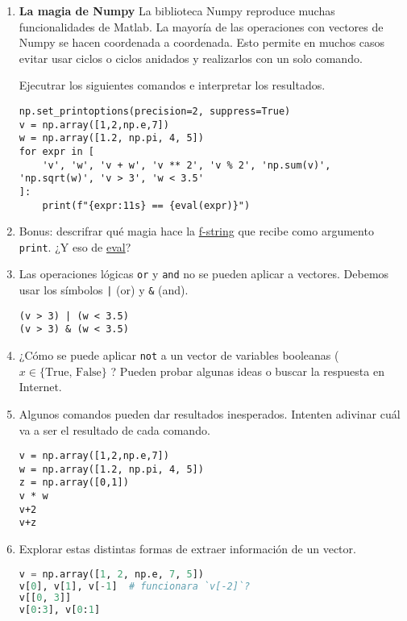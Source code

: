 \documentclass[a4paper,11pt]{article}
\theoremstyle{definition}
\begin{document}
\begin{enumerate}
\begin{lstlisting}
import numpy as np
v = np.array([1,2,3])
w = np.array([1.2, 7, np.pi])
v, w, v + w
\end{lstlisting}

\item \textbf{La magia de Numpy} La biblioteca Numpy reproduce muchas funcionalidades de Matlab. La mayoría de las operaciones con vectores de Numpy se hacen coordenada a coordenada. Esto permite en muchos casos evitar usar ciclos o ciclos anidados y realizarlos con un solo comando.

Ejecutrar los siguientes comandos e interpretar los resultados. 

\begin{lstlisting}
np.set_printoptions(precision=2, suppress=True)
v = np.array([1,2,np.e,7])
w = np.array([1.2, np.pi, 4, 5])
for expr in [
    'v', 'w', 'v + w', 'v ** 2', 'v % 2', 'np.sum(v)', 'np.sqrt(w)', 'v > 3', 'w < 3.5'
]:
    print(f"{expr:11s} == {eval(expr)}")
\end{lstlisting}

\item Bonus: descrifrar qué magia hace la 
\href{https://docs.python.org/es/3.11/tutorial/inputoutput.html\#tut-f-strings}{f-string} que recibe como argumento \lstinline{print}. ¿Y eso de \href{https://docs.python.org/es/3.11/library/functions.html\#eval}{eval}?

\item Las operaciones lógicas \lstinline{or} y \lstinline{and} no se pueden aplicar a vectores. Debemos usar los símbolos \lstinline{|} (or) y \lstinline{&} (and).
\begin{lstlisting}
(v > 3) | (w < 3.5)
(v > 3) & (w < 3.5)
\end{lstlisting}

\item ¿Cómo se puede aplicar \lstinline{not} a un vector de variables booleanas ( $x \in \{\text{True, False}\}$ ? Pueden probar algunas ideas o buscar la respuesta en Internet.

\item Algunos comandos pueden dar resultados inesperados. Intenten adivinar cuál va a ser el resultado de cada comando.
\begin{lstlisting}
v = np.array([1,2,np.e,7])
w = np.array([1.2, np.pi, 4, 5])
z = np.array([0,1])
v * w
v+2
v+z
\end{lstlisting}

\item Explorar estas distintas formas de extraer información de un vector.
\begin{lstlisting}[language=Python]
v = np.array([1, 2, np.e, 7, 5])
v[0], v[1], v[-1]  # funcionara `v[-2]`?
v[[0, 3]]
v[0:3], v[0:1]
\end{lstlisting}


\end{enumerate}
\end{document}
